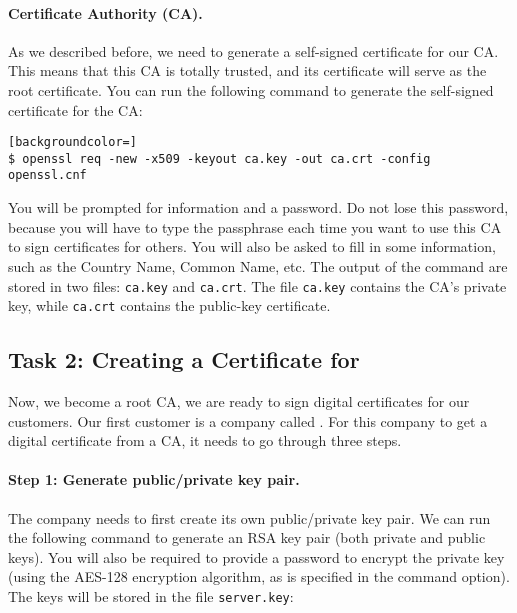 \paragraph{Certificate Authority (CA).} 
As we described before, we need to generate a self-signed certificate for our
CA. This means that this CA is totally trusted, and its certificate will serve
as the root certificate.  You can run the following command to generate  
the self-signed certificate for the CA:


\begin{lstlisting}[backgroundcolor=]
$ openssl req -new -x509 -keyout ca.key -out ca.crt -config openssl.cnf
\end{lstlisting}

You will be prompted for information and a password. Do not lose this password,
because you will have to type the passphrase 
each time you want to use this CA to sign certificates for others.
You will also be asked to fill in some information,
such as the Country Name, Common Name, etc. 
The output of the command are stored in two files: {\tt ca.key} and 
{\tt ca.crt}. The file {\tt ca.key} contains the 
CA's private key, while {\tt ca.crt} contains the public-key certificate.



\subsection{Task 2: Creating a Certificate for \pkiserver}

Now, we become a root CA, we are ready to sign digital certificates for 
our customers. Our first customer is a company called \pkiserver.
For this company to get a digital certificate from a CA, it needs to
go through three steps.


\paragraph{Step 1: Generate public/private key pair.}
The company needs to first create its own public/private key pair. We can run  
the following command to generate an RSA key pair (both private and public keys).  
You will also be required to provide a password to encrypt the private 
key (using the AES-128 encryption algorithm, as is specified in the command option). 
The keys will be stored in the file \texttt{server.key}:

